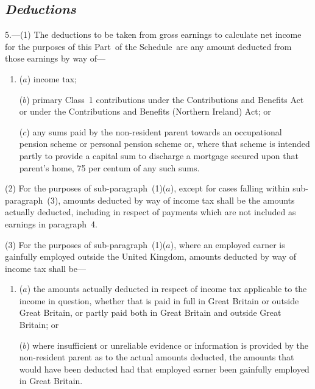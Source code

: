 \documentclass[12pt,a4paper]{article}
\begin{document}

\subsection*{\itshape Deductions}

5.---(1)  The deductions to be taken from gross earnings to calculate net income for the purposes of this Part~of the Schedule~are any amount deducted from those earnings by way of—
\begin{enumerate}\item[]
($a$) income tax;

($b$) primary Class~1 contributions under the Contributions and Benefits Act or under the Contributions and Benefits (Northern Ireland) Act; or

($c$) any sums paid by the non-resident parent towards an occupational pension scheme or personal pension scheme or, where that scheme is intended partly to provide a capital sum to discharge a mortgage secured upon that parent’s home, 75 per centum of any such sums.
\end{enumerate}

(2) For the purposes of sub-paragraph~(1)($a$), 
except for cases falling within sub-paragraph~(3),  %
amounts deducted by way of income tax shall be the amounts actually deducted, including in respect of payments which are not included as earnings in paragraph~4.

(3) For the purposes of sub-paragraph~(1)($a$), where an employed earner is gainfully employed outside the United Kingdom, amounts deducted by way of income tax shall be---
\begin{enumerate}\item[]
($a$) the amounts actually deducted in respect of income tax applicable to the income in question, whether that is paid in full in Great Britain or outside Great Britain, or partly paid both in Great Britain and outside Great Britain; or

($b$) where insufficient or unreliable evidence or information is provided by the non-resident parent as to the actual amounts deducted, the amounts that would have been deducted had that employed earner been gainfully employed in Great Britain.
\end{enumerate}
\end{document}
